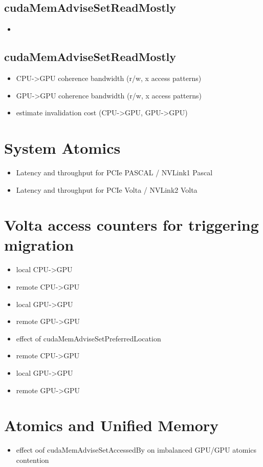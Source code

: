 \subsection{cudaMemAdviseSetReadMostly}
\begin{itemize}
    \item
\end{itemize}

\subsection{cudaMemAdviseSetReadMostly}
\begin{itemize}
    \item CPU->GPU coherence bandwidth (r/w, x access patterns)
    \item GPU->GPU coherence bandwidth (r/w, x access patterns)
    \item estimate invalidation cost (CPU->GPU, GPU->GPU)
\end{itemize}


\section{System Atomics}

\begin{itemize}
    \item Latency and throughput for PCIe PASCAL / NVLink1 Pascal 
    \item Latency and throughput for PCIe Volta / NVLink2 Volta
\end{itemize}

\section{Volta access counters for triggering migration}
\begin{itemize}
    \item local CPU->GPU
    \item remote CPU->GPU
    \item local GPU->GPU
    \item remote GPU->GPU
\end{itemize}

\begin{itemize}
    \item effect of cudaMemAdviseSetPreferredLocation
    \item remote CPU->GPU
    \item local GPU->GPU
    \item remote GPU->GPU
\end{itemize}

\section{Atomics and Unified Memory}
\begin{itemize}
    \item effect oof cudaMemAdviseSetAccessedBy on imbalanced GPU/GPU atomics contention
\end{itemize}